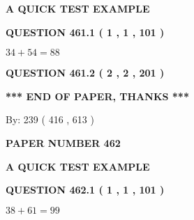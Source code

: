 \documentclass[12pt]{article}
\begin{document}
   
   
   
 \vspace{0.2in}
{\LARGE {\textbf{ A QUICK TEST EXAMPLE}}}
   
   
  
\vspace{0.2in}
  
{\textbf{\Large{QUESTION
461.1 
 ( 1 , 1 , 101 )
}}}
  
  
 
 

$ %
34 +  %
54=   %
88$
 
 
  
\vspace{0.2in}
  
{\textbf{\Large{QUESTION
461.2 
 ( 2 , 2 , 201 )
}}}
  
  
   
   
 \vspace{0.2in}
 
   
   
   
   
\vspace{1.0in} 
{\textbf{\large{ *** END OF PAPER, THANKS *** }}} 
   
   
\hspace{1.0in} By: 
 239 ( 416 ,  613 )
   
   
   
   
\newpage 
\setcounter{page}{ 
   462001 } 
   
   
   
   
 {\textbf{ \Large{ PAPER NUMBER  462  }}}
   
   
\vspace{0.2in}
   
   
   
   
   
   
 \vspace{0.2in}
{\LARGE {\textbf{ A QUICK TEST EXAMPLE}}}
   
   
  
\vspace{0.2in}
  
{\textbf{\Large{QUESTION
462.1 
 ( 1 , 1 , 101 )
}}}
  
  
 
 

$ %
38 +  %
61=   %
99$
 
 
  
\vspace{0.2in}
  
\end{document}
